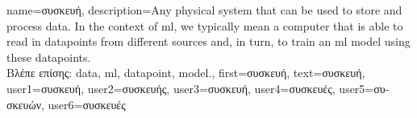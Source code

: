 {name={\foreignlanguage{greek}{συσκευή}},
	description={Any physical system that can be used to store and process \gls{data}. In the context of \gls{ml}, 
		we typically mean a computer that is able to read in \gls{datapoint}s from different 
		sources and, in turn, to train an \gls{ml} \gls{model} using these \gls{datapoint}s.\\
	\foreignlanguage{greek}{Βλέπε επίσης:} \gls{data}, \gls{ml}, \gls{datapoint}, \gls{model}.},
				first={\foreignlanguage{greek}{συσκευή}},
				text={\foreignlanguage{greek}{συσκευή}},
				user1={\foreignlanguage{greek}{συσκευή}}, %
				user2={\foreignlanguage{greek}{συσκευής}}, %
				user3={\foreignlanguage{greek}{συσκευή}}, %
				user4={\foreignlanguage{greek}{συσκευές}}, %
				user5={\foreignlanguage{greek}{συσκευών}}, %
				user6={\foreignlanguage{greek}{συσκευές}} %
}

